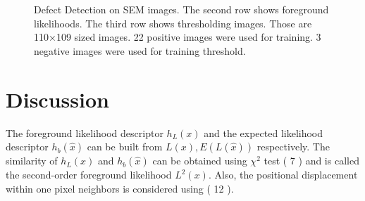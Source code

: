 \documentclass[a4paper,twocolumn, 10pt]{article}
\begin{document}
\begin{figure}[t]
  \hfill
  \hfill
  \hfill
  \caption{Defect Detection on SEM images. The second row shows foreground likelihoods. The third row shows thresholding images. Those are 110×109 sized images. 22 positive images were used for training. 3 negative images were used for training threshold.}
\end{figure}



\section{Discussion}





The foreground likelihood descriptor \begin{math} h_L(x) \end{math} and the expected likelihood descriptor
\begin{math} h_b(\hat{x}) \end{math} can be built from \begin{math} L(x), E(L(\hat{x})) \end{math} respectively.
The similarity of \begin{math} h_L(x) \end{math}  and \begin{math} h_b(\hat{x}) \end{math} can be obtained using 
\begin{math} \chi ^2 \end{math} test ( 7 ) and is called the second-order foreground likelihood \begin{math} L^2(x) \end{math}.
Also, the positional displacement within one pixel neighbors is considered using ( 12 ).
\end{document}
